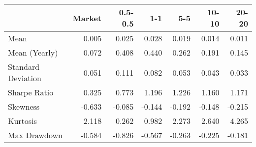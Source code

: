 \begin{tabular}{lrrrrrr}
\toprule
{} &  Market &  0.5-0.5 &    1-1 &    5-5 &  10-10 &  20-20 \\
\midrule
Mean               &   0.005 &    0.025 &  0.028 &  0.019 &  0.014 &  0.011 \\
Mean (Yearly)      &   0.072 &    0.408 &  0.440 &  0.262 &  0.191 &  0.145 \\
Standard Deviation &   0.051 &    0.111 &  0.082 &  0.053 &  0.043 &  0.033 \\
Sharpe Ratio       &   0.325 &    0.773 &  1.196 &  1.226 &  1.160 &  1.171 \\
Skewness           &  -0.633 &   -0.085 & -0.144 & -0.192 & -0.148 & -0.215 \\
Kurtosis           &   2.118 &    0.262 &  0.982 &  2.273 &  2.640 &  4.265 \\
Max Drawdown       &  -0.584 &   -0.826 & -0.567 & -0.263 & -0.225 & -0.181 \\
\bottomrule
\end{tabular}
